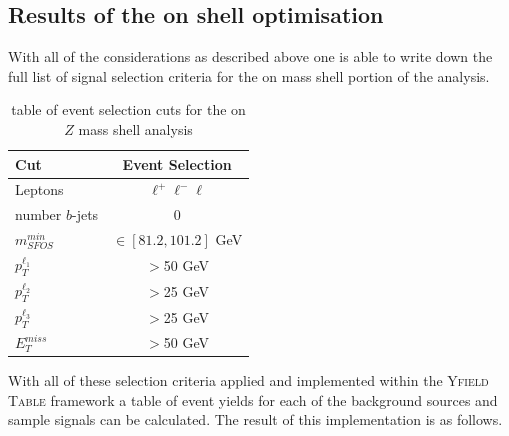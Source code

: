 \subsection{Results of the on shell optimisation}
With all of the considerations as described above one is able to write down the full list of signal selection criteria for the on mass shell portion of the analysis.

\begin{table}[H]
\begin{center}
\begin{tabular}{l | c}
\toprule
Cut & Event Selection \\
\hline
Leptons & $\ell^{+} \ell^{-} \ell$ \\
\hline \hline
number $b$-jets & 0 \\
\hline
$m_{SFOS}^{min}$ & $\in [81.2, 101.2]$ GeV \\
\hline
$p_{T}^{\ell_{1}}$ & $>$50 GeV \\
\hline
$p_{T}^{\ell_{2}}$ & $>$25 GeV \\
\hline
$p_{T}^{\ell_{3}}$ & $>$25 GeV \\
\hline
$E_{T}^{miss}$ & $>$50 GeV \\
\bottomrule
\end{tabular}
\end{center}
\caption{table of event selection cuts for the on $Z$ mass shell analysis}
\label{tab:onShellConditions}
\end{table}

\noindent With all of these selection criteria applied and implemented within the Y{\scshape field Table} framework a table of event yields for each of the background sources and sample signals can be calculated.
The result of this implementation is as follows.

